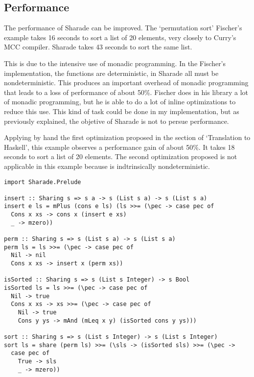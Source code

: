 \documentclass[class=article, crop=false]{standalone}
\begin{document}
\subsection{Performance}

The performance of Sharade can be improved. The `permutation sort' Fischer's example takes
16 seconds to sort a list of 20 elements, very closely to Curry's MCC
compiler\cite{lux2003munster}. Sharade takes 43 seconds to sort the same list.

This is due to the intensive use of monadic programming. In the Fischer's implementation, the
functions are deterministic, in Sharade all must be nondeterministic. This produces an
important overhead of monadic programming that leads to a loss of performance of about 50\%.
Fischer does in his library a lot of monadic programming, but he is able to do a lot of
inline optimizations to reduce this use. This kind of task could be done in my
implementation, but as previously explained, the objetive of Sharade is not to persue
performance.

Applying by hand the first optimization proposed in the section of `Translation to Haskell',
this example observes a performance gain of about 50\%. It takes 18 seconds to sort a list of
20 elements. The second optimization proposed is not applicable in this example because is
indtrinsically nondeterministic.

\begin{verbatim}
import Sharade.Prelude

insert :: Sharing s => s a -> s (List s a) -> s (List s a)
insert e ls = mPlus (cons e ls) (ls >>= (\pec -> case pec of
  Cons x xs -> cons x (insert e xs)
  _ -> mzero))

perm :: Sharing s => s (List s a) -> s (List s a)
perm ls = ls >>= (\pec -> case pec of
  Nil -> nil
  Cons x xs -> insert x (perm xs))

isSorted :: Sharing s => s (List s Integer) -> s Bool
isSorted ls = ls >>= (\pec -> case pec of
  Nil -> true
  Cons x xs -> xs >>= (\pec -> case pec of
    Nil -> true
    Cons y ys -> mAnd (mLeq x y) (isSorted cons y ys)))

sort :: Sharing s => s (List s Integer) -> s (List s Integer)
sort ls = share (perm ls) >>= (\sls -> (isSorted sls) >>= (\pec ->
  case pec of
    True -> sls
    _ -> mzero))
\end{verbatim}
\end{document}
